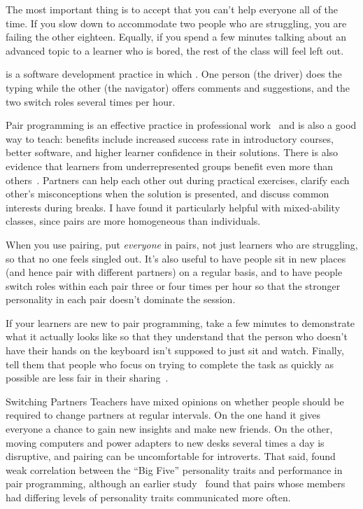 The most important thing is to accept that
you can't help everyone all of the time.
If you slow down to accommodate two people who are struggling,
you are failing the other eighteen.
Equally,
if you spend a few minutes talking about an advanced topic to a learner who is bored,
the rest of the class will feel left out.


 is a software development practice
in which .
One person (the driver) does the typing
while the other (the navigator) offers comments and suggestions,
and the two switch roles several times per hour.

Pair programming is an effective practice in professional work~\cite{Hann2009}
and is also a good way to teach:
benefits include increased success rate in introductory courses,
better software,
and higher learner confidence in their solutions.
There is also evidence that learners from underrepresented groups
benefit even more than others~\cite{McDo2006,Hank2011,Port2013,Cele2018}.
Partners can help each other out during practical exercises,
clarify each other's misconceptions when the solution is presented,
and discuss common interests during breaks.
I have found it particularly helpful with mixed-ability classes,
since pairs are more homogeneous than individuals.

When you use pairing,
put \emph{everyone} in pairs,
not just learners who are struggling,
so that no one feels singled out.
It's also useful to have people sit in new places
(and hence pair with different partners)
on a regular basis,
and to have people switch roles within each pair three or four times per hour
so that the stronger personality in each pair doesn't dominate the session.

If your learners are new to pair programming,
take a few minutes to demonstrate what it actually looks like
so that they understand that
the person who doesn't have their hands on the keyboard
isn't supposed to just sit and watch.
Finally,
tell them that people who focus on trying to complete the task as quickly as possible
are less fair in their sharing~\cite{Lewi2015}.

\begin{aside}{Switching Partners}
  Teachers have mixed opinions on whether people should be required to change partners at regular intervals.
  On the one hand it gives everyone a chance to gain new insights and make new friends.
  On the other,
  moving computers and power adapters to new desks several times a day is disruptive,
  and pairing can be uncomfortable for introverts.
  That said,
  \cite{Hann2010} found weak correlation between the ``Big Five'' personality traits
  and performance in pair programming,
  although an earlier study~\cite{Wall2009} found that
  pairs whose members had differing levels of personality traits communicated more often.
\end{aside}

